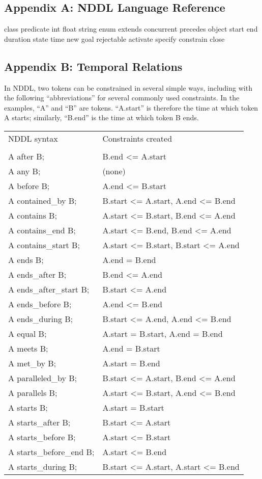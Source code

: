 \documentclass[10pt, letterpaper, twoside]{article}
\begin{document}
\subsection{Appendix A: NDDL Language Reference}

class
predicate
int
float
string
enum
extends
concurrent
precedes
object
start
end
duration
state
time
new
goal
rejectable
activate
specify
constrain
close

\subsection{Appendix B: Temporal Relations}

In NDDL, two tokens can be constrained in several simple ways,
including with the following ``abbreviations'' for several commonly
used constraints.  In the examples, ``A'' and ``B'' are tokens.
``A.start'' is therefore the time at which token A starts; similarly,
``B.end'' is the time at which token B ends.

\begin{tabular}{ll}
NDDL syntax & Constraints created \\
\cline{1-2} \\
A after B; & B.end <= A.start \\
A any B; & (none) \\
A before B; & A.end <= B.start \\
A contained\_by B; & B.start <= A.start, A.end <= B.end \\
A contains B; & A.start <= B.start, B.end <= A.end \\
A contains\_end B; & A.start <= B.end, B.end <= A.end \\
A contains\_start B; & A.start <= B.start, B.start <= A.end \\
A ends B; & A.end = B.end \\
A ends\_after B; & B.end <= A.end \\
A ends\_after\_start B; & B.start <= A.end \\
A ends\_before B; & A.end <= B.end \\
A ends\_during B; & B.start <= A.end, A.end <= B.end \\
A equal B; & A.start = B.start, A.end = B.end \\
A meets B; & A.end = B.start \\
A met\_by B; & A.start = B.end \\
A paralleled\_by B; & B.start <= A.start, B.end <= A.end \\
A parallels B; & A.start <= B.start, A.end <= B.end \\
A starts B; & A.start = B.start \\
A starts\_after B; & B.start <= A.start \\
A starts\_before B; & A.start <= B.start \\
A starts\_before\_end B; & A.start <= B.end \\
A starts\_during B; & B.start <= A.start, A.start <= B.end \\
\end{tabular}
\end{document}
